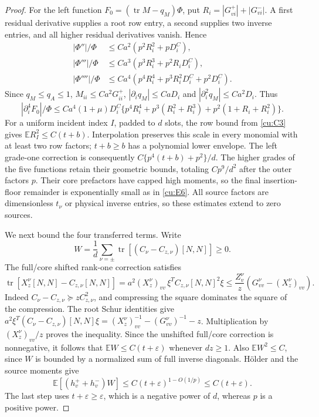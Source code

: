 \documentclass[10pt]{article}
\numberwithin{equation}{section}
\newcommand{\1}{\mathbf1}
\begin{document}
\begin{proof}
For the left function $F_0=(\operatorname{tr}M-q_M)\Phi$, put
$R_i=|G^+_{vi}|+|G^-_{vi}|$.
A first residual derivative supplies a root row entry, a second
supplies two inverse entries, and all higher residual derivatives
vanish. Hence
\[
 \begin{aligned}
 |\Phi''|/\Phi&\le Ca^2(p^2R_i^2+pD_i^C),\\
 |\Phi'''|/\Phi&\le Ca^3(p^3R_i^3+p^2R_iD_i^C),\\
 |\Phi''''|/\Phi&\le Ca^4(p^4R_i^4+p^3R_i^2D_i^C+p^2D_i^C).
 \end{aligned}
\]
Since $q_M\le q_A\le1$, $M_{ii}\le Ca^2G^+_{ii}$,
$|\partial_iq_M|\le CaD_i$ and
$|\partial_i^2q_M|\le Ca^2D_i$. Thus
\[
 |\partial_i^4F_0|/\Phi
 \le Ca^4(1+\mu)D_i^C
 \{p^4R_i^4+p^3(R_i^2+R_i^3)+p^2(1+R_i+R_i^2)\}.
\]
For a uniform incident index $I$, padded to $d$ slots, the row bound
from \eqref{cu:C3} gives $\mathbb ER_I^2\le C(t+b)$.
Interpolation preserves this scale in every monomial with at least
two row factors; $t+b\ge b$ has a polynomial lower envelope.
The left grade-one correction is consequently
$C\{p^4(t+b)+p^2\}/d$.
The higher grades of the five functions retain their geometric
bounds, totaling $Cp^9/d^2$ after the outer factors $p$.
Their core prefactors have capped high moments, so the final
insertion-floor remainder is exponentially small as in \eqref{cu:E6}.
All source factors are dimensionless $t_\nu$ or physical inverse
entries, so these estimates extend to zero sources.

We next bound the four transferred terms. Write
\[
 W=\frac1d\sum_{\nu=\pm}\operatorname{tr}
                   [(C_\nu-C_{z,\nu})[N,N]]\ge0.
\]
The full/core shifted rank-one correction satisfies
\[
 \operatorname{tr}[X_z^\nu[N,N]-C_{z,\nu}[N,N]]
 =a^2(X_z^\nu)_{vv}\,\xi^TC_{z,\nu}[N,N]^2\xi
 \le\frac{Z_v^\nu}{z}(G^\nu_{vv}-(X_z^\nu)_{vv}).
 \tag{C5}\label{cu:C5}
\]
Indeed $C_\nu-C_{z,\nu}\succeq zC_{z,\nu}^2$, and compressing the
square dominates the square of the compression. The root Schur
identities give
$a^2\xi^T(C_\nu-C_{z,\nu})[N,N]\xi
=(X_z^\nu)_{vv}^{-1}-(G^\nu_{vv})^{-1}-z$.
Multiplication by $(X_z^\nu)_{vv}/z$ proves the inequality.
Since the unshifted full/core correction is nonnegative, it follows
that $\mathbb EW\le C(t+\varepsilon)$ whenever $dz\ge1$.
Also $\mathbb EW^2\le C$, since $W$ is bounded by a normalized sum
of full inverse diagonals. H\"older and the source moments give
\[
 \mathbb E[(h_v^++h_v^-)W]
 \le C(t+\varepsilon)^{1-O(1/p)}\le C(t+\varepsilon).
\]
The last step uses $t+\varepsilon\ge\varepsilon$, which is a negative
power of $d$, whereas $p$ is a positive power.


\end{proof}
\end{document}

